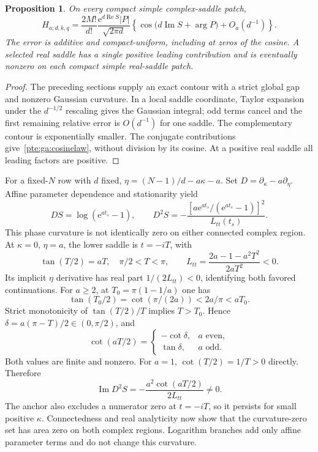 \documentclass[11pt,a4paper]{article}
\numberwithin{equation}{section}
\newtheorem{proposition}[theorem]{Proposition}
\theoremstyle{definition}
\theoremstyle{plain}
\newcommand{\ee}{\mathrm e}
\begin{document}
\begin{proposition}\label{pte:ga:cosine}
On every compact simple complex-saddle patch,
\begin{equation}\label{pte:ga:cosinelaw}
 H_{a;d,k,q}=\frac{2M!}{d!}\frac{\ee^{d\operatorname{Re}S}|P|}{\sqrt{2\pi d}}
 \left\{\cos\bigl(d\operatorname{Im}S+\arg P\bigr)+O_a(d^{-1})\right\}.
\end{equation}
The error is additive and compact-uniform, including at zeros of the cosine. A selected real saddle has a single positive leading contribution and is eventually nonzero on each compact simple real-saddle patch.
\end{proposition}
\begin{proof}
The preceding sections supply an exact contour with a strict global gap and nonzero Gaussian curvature. In a local saddle coordinate, Taylor expansion under the $d^{-1/2}$ rescaling gives the Gaussian integral; odd terms cancel and the first remaining relative error is $O(d^{-1})$ for one saddle. The complementary contour is exponentially smaller. The conjugate contributions give~\eqref{pte:ga:cosinelaw}, without division by its cosine. At a positive real saddle all leading factors are positive.
\end{proof}

For a fixed-$N$ row with $d$ fixed, $\eta=(N-1)/d-a\kappa-a$. Set $D=\partial_\kappa-a\partial_\eta$. Affine parameter dependence and stationarity yield
\begin{equation}\label{pte:ga:curvature}
 DS=\log(\ee^{at_s}-1),\qquad
 D^2S=-\frac{[a\ee^{at_s}/(\ee^{at_s}-1)]^2}{L_{tt}(t_s)}.
\end{equation}
This phase curvature is not identically zero on either connected complex region. At $\kappa=0$, $\eta=a$, the lower saddle is $t=-iT$, with
\begin{equation}\label{pte:ga:anchor}
 \tan(T/2)=aT,\quad \pi/2<T<\pi,\qquad
 L_{tt}=\frac{2a-1-a^2T^2}{2aT^2}<0.
\end{equation}
Its implicit $\eta$ derivative has real part $1/(2L_{tt})<0$, identifying both favored continuations. For $a\ge2$, at $T_0=\pi(1-1/a)$ one has
\[
 \tan(T_0/2)=\cot(\pi/(2a))<2a/\pi<aT_0.
\]
Strict monotonicity of $\tan(T/2)/T$ implies $T>T_0$. Hence $\delta=a(\pi-T)/2\in(0,\pi/2)$, and
\[
 \cot(aT/2)=\begin{cases}-\cot\delta,&a\text{ even},\\
                         \tan\delta,&a\text{ odd}.
          \end{cases}
\]
Both values are finite and nonzero. For $a=1$, $\cot(T/2)=1/T>0$ directly. Therefore
\begin{equation}\label{pte:ga:nonzeroanchor}
 \operatorname{Im}D^2S=-\frac{a^2\cot(aT/2)}{2L_{tt}}\ne0.
\end{equation}
The anchor also excludes a numerator zero at $t=-iT$, so it persists for small positive $\kappa$. Connectedness and real analyticity now show that the curvature-zero set has area zero on both complex regions. Logarithm branches add only affine parameter terms and do not change this curvature.
\end{document}
